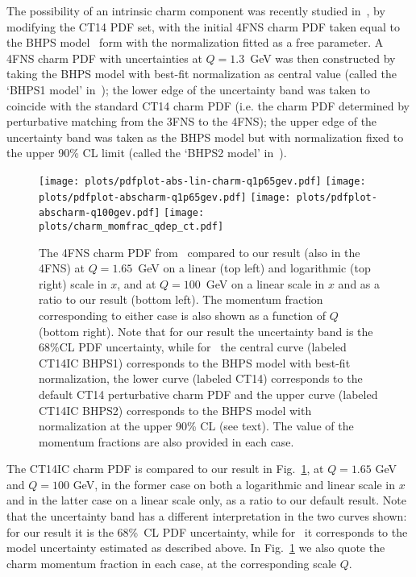 The possibility of an intrinsic charm component was recently studied
in~\cite{Hou:2017khm}, by modifying the CT14 PDF set, with the
initial 4FNS charm PDF taken equal to the BHPS
model~\cite{Brodsky:1980pb} form with the normalization fitted as a
free parameter.
%
A 4FNS  charm PDF with uncertainties at $Q=1.3$~GeV was then
constructed by taking 
the BHPS model with best-fit normalization as central value (called
the `BHPS1 model' in~\cite{Hou:2017khm}); the lower
edge of the uncertainty band was taken to coincide with the standard
CT14 charm PDF  (i.e. the charm PDF determined by perturbative
matching from the 3FNS to the 4FNS); the upper edge of the uncertainty
band was taken as 
the BHPS model but with  normalization fixed to the upper  90\% CL limit (called the
`BHPS2 model' in~\cite{Hou:2017khm}).

\begin{figure}[h]
  \begin{center}
    \texttt{[image: plots/pdfplot-abs-lin-charm-q1p65gev.pdf]}
    \texttt{[image: plots/pdfplot-abscharm-q1p65gev.pdf]}    \texttt{[image: plots/pdfplot-abscharm-q100gev.pdf]}	
    \texttt{[image: plots/charm\_momfrac\_qdep\_ct.pdf]}
    \caption{\small The 4FNS charm PDF
    from~\cite{Hou:2017khm} compared to our result (also in the 4FNS) 
     at $Q=1.65$~GeV on
    a linear (top left) and logarithmic (top right) scale in $x$, and
    at  $Q=100$~GeV on a linear scale in $x$ and as a ratio to our result
    (bottom left).
    The momentum fraction corresponding to either case
    is also shown as a function of $Q$ (bottom right). Note that for
    our result the uncertainty band is the 68\%CL PDF uncertainty,
    while for~\cite{Hou:2017khm} the central curve (labeled
    CT14IC BHPS1) corresponds to the BHPS model with best-fit
    normalization, the lower curve (labeled
    CT14) corresponds to the default CT14 perturbative charm PDF and
    the upper curve (labeled
    CT14IC BHPS2) corresponds to the BHPS model with normalization at
    the upper 90\% CL (see text). The value of the momentum fractions
    are also provided in each case.
  \label{fig:ic/comparison_CT14} }
\end{center}
\end{figure}

The CT14IC charm PDF is compared to our result in
Fig.~\ref{fig:ic/comparison_CT14}, at  $Q=1.65$ GeV and $Q=100$ GeV, in
the former case on both a logarithmic and linear scale in $x$ and in
the latter case on a linear scale only, as a ratio to our default
result.
%
Note that the uncertainty band has a different interpretation in the
two curves shown: for our result it is the 68\%~CL PDF uncertainty,
while for~\cite{Hou:2017khm}  it corresponds to the model
uncertainty estimated as described above.
%
In Fig.~\ref{fig:ic/comparison_CT14} we also quote
the charm momentum fraction in each case, at the corresponding scale $Q$. 

